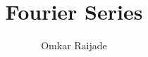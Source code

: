 \documentclass[journal,12pt,twocolumn]{IEEEtran}
\begin{document}
	\let\StandardTheFigure\thefigure
	\renewcommand{\thefigure}{\theproblem}
	
	
	
	\def\putbox#1#2#3{\makebox[0in][l]{\makebox[#1][l]{}\raisebox{\baselineskip}[0in][0in]{\raisebox{#2}[0in][0in]{#3}}}}
	\def\rightbox#1{\makebox[0in][r]{#1}}
	\def\centbox#1{\makebox[0in]{#1}}
	\def\topbox#1{\raisebox{-\baselineskip}[0in][0in]{#1}}
	\def\midbox#1{\raisebox{-0.5\baselineskip}[0in][0in]{#1}}
	
	\vspace{3cm}
	
	\title{ 
		Fourier Series
	}
	
	
	
	\author{ Omkar Raijade %
		
}
% 
%
\end{document}
